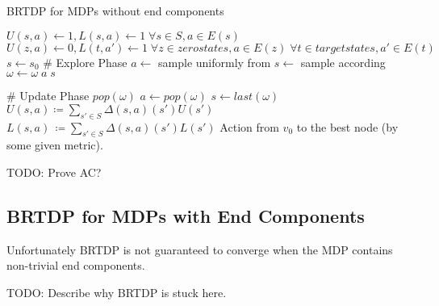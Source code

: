 \begin{algorithm}
\caption{BRTDP for MDPs without end components}
\label{brtdp}
\begin{algorithmic}
\State $U(s,a) \gets 1, L(s,a) \gets 1 \; \forall s \in S, a \in E(s)$
\State $U(z,a) \gets 0, L(t,a') \gets 1
    \; \forall z \in zero states, a \in E(z)
    \; \forall t \in target states, a' \in E(t)$
\State $s \gets s_0$
    \State \# Explore Phase
        \State $a \gets$ sample uniformly from
        \State $s \gets $ sample according
        \State $\omega \gets \omega \; a \; s$
    \EndWhile

    \State \# Update Phase
        \State $pop(\omega)$
        \State $a \gets pop(\omega)$
        \State $s \gets last(\omega)$
        \State $U(s,a) \coloneqq \sum_{s' \in S} \Delta(s,a)(s')U(s')$
        \State $L(s,a)\, \coloneqq \sum_{s' \in S} \Delta(s,a)(s')L(s')$
    \EndWhile
\EndWhile
\State \Return Action from $v_0$ to the best node (by some
given metric).
\end{algorithmic}
\end{algorithm}

TODO: Prove AC?

\subsection*{BRTDP for MDPs with End Components}
Unfortunately BRTDP is not guaranteed to converge when the MDP
contains non-trivial end components.

\begin{example}
TODO: Describe why BRTDP is stuck here.

\begin{center}
\end{center}
\end{example}

